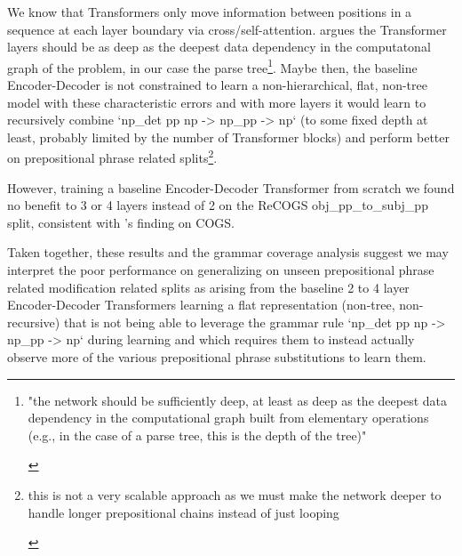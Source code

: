 \documentclass[11pt]{article}
\begin{document}
We know that Transformers only move information between positions in a sequence at each layer boundary via cross/self-attention. \cite{Csordas2022} argues the Transformer layers should be as deep as the deepest data dependency in the computatonal graph of the problem, in our case the parse tree\footnote{
\begin{tiny}
"the network should be sufficiently deep, at least as deep as the deepest data dependency in the computational graph built from elementary operations (e.g., in the case of a parse tree, this is the depth of the tree)"
\end{tiny}
}. Maybe then, the \cite{Wu2023} baseline Encoder-Decoder is not constrained to learn a non-hierarchical, flat, non-tree model with these characteristic errors and with more layers it would learn to recursively combine `np\_det pp np -> np\_pp -> np` (to some fixed depth at least, probably limited by the number of Transformer blocks) and perform better on prepositional phrase related splits\footnote{
\begin{tiny}
this is not a very scalable approach as we must make the network deeper to handle longer prepositional chains instead of just looping
\end{tiny}
}.

However, training a \cite{Wu2023} baseline Encoder-Decoder Transformer from scratch we found no benefit to 3 or 4 layers instead of 2 on the ReCOGS obj\_pp\_to\_subj\_pp split, consistent with \cite{petty2024impactdepthcompositionalgeneralization}'s finding on COGS.

Taken together, these results and the grammar coverage analysis suggest we may interpret the poor performance on generalizing on unseen prepositional phrase related modification related splits as arising from the baseline 2 to 4 layer Encoder-Decoder Transformers learning a flat representation (non-tree, non-recursive) that is not being able to leverage the grammar rule `np\_det pp np -> np\_pp -> np` during learning and which requires them to instead actually observe more of the various prepositional phrase substitutions to learn them.
\end{document}
